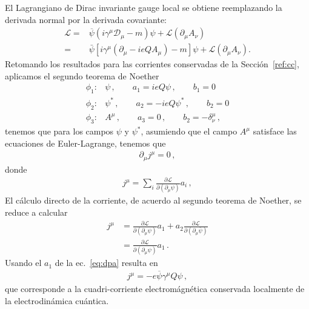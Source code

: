 \begin{frame}
El Lagrangiano de Dirac invariante gauge local se obtiene reemplazando la derivada normal por la derivada covariante:
\begin{align}
  \mathcal{L}=&\overline{\psi}\left(i\gamma^\mu\mathcal{D}_\mu-m\right)\psi+\mathcal{L}\left( \partial_{\mu}A_{\nu}\right)\nonumber\\
=&\bar{\psi}\left[i\gamma^\mu\left(\partial_\mu-ieQA_\mu\right)-m\right]\psi +\mathcal{L}\left( \partial_{\mu}A_{\nu}\right).
\end{align}
Retomando los resultados para las corrientes conservadas de la Sección~\ref{ref:cc}, aplicamos el segundo teorema de Noether 
\begin{align}
\label{eq:dpa}
  \phi_{1}:& \psi\,,\qquad a_{1}=ie Q \psi \,,\qquad b_1=0\nonumber\\
  \phi_{2}:& \psi^{*}\,,\qquad a_{2}=-ie Q\psi^{*}\,,\qquad b_2=0 \nonumber\\
  \phi_{3}:& A^{\mu}\,,\qquad a_{3}=0\,,\qquad b_2=-\delta^{\mu}_{\nu}\,,
\end{align}
tenemos que para los campos $\psi$ y $\psi^{*}$, asumiendo que el campo $A^{\mu}$ satisface las ecuaciones de Euler-Lagrange, tenemos que
\begin{align}
  \partial_{\mu}j^{\mu}=0\,,
\end{align}
donde
\begin{align}
  j^{\mu}=\sum_i\frac{\partial \mathcal{L}}{\partial\left(\partial_{\mu} \psi \right)}a_i\,,
\end{align}
El cálculo directo de la  corriente, de acuerdo al segundo teorema de Noether, se reduce a calcular 
\begin{align}
  j^\mu&=\frac{\partial\mathcal{L}}{\partial\left(\partial_\mu\psi\right)}a_1+a_2\frac{\partial\mathcal{L}}{\partial\left(\partial_\mu\bar{\psi}\right)} \nonumber\\
  &=\frac{\partial\mathcal{L}}{\partial\left(\partial_\mu\psi\right)}a_1\,.
\end{align}
Usando el $a_1$ de la ec.~\eqref{eq:dpa}
resulta en
\begin{align}
  j^{\mu}=-e\overline{\psi}\gamma^{\mu} Q \psi\,,
\end{align}
que corresponde a la cuadri-corriente electromágnética conservada localmente de la electrodinámica cuántica.




\end{frame}
